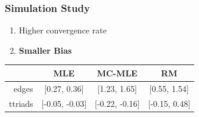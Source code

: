 \documentclass[aspectratio=169, 9pt]{beamer}
\begin{document}
\begin{frame}[t, label=ergmitoexperiment]
	\frametitle{Simulation Study}

	\begin{minipage}[t]{.3\linewidth}
		\begin{enumerate}
			\item Higher convergence rate
			\item \alert{\bf Smaller Bias}
		\end{enumerate}
	\end{minipage}
\vfill\hfill\begin{minipage}[t]{.65\linewidth}\vspace{-.75cm}
		\begin{table}
		\centering
		\begin{tabular}{rccc}
			\toprule
			& MLE & MC-MLE & RM \\ 
			\midrule
			edges & [0.27, 0.36] & [1.23, 1.65] & [0.55, 1.54] \\ 
			ttriads & [-0.05, -0.03] & [-0.22, -0.16] & [-0.15, 0.48] \\ 
			\bottomrule
		\end{tabular}
	\end{table}

\hfill\hyperlink{ergmito-bias}{}
	\end{minipage}
\end{frame}
\end{document}
